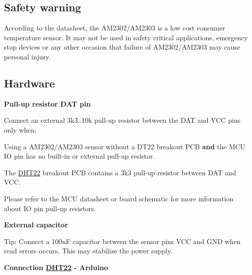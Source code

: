 \subsection*{Safety warning}

According to the datasheet, the A\+M2302/\+A\+M2303 is a low cost consumer temperature sensor. It may not be used in safety critical applications, emergency stop devices or any other occasion that failure of A\+M2302/\+A\+M2303 may cause personal injury.

\subsection*{Hardware}



{\bfseries Pull-\/up resistor D\+AT pin}


\begin{DoxyItemize}
\item Connect an external {\ttfamily 3k3..10k} pull-\/up resistor between the {\ttfamily D\+AT} and {\ttfamily V\+CC} pins only when\+:
\begin{DoxyItemize}
\item Using a A\+M2302/\+A\+M2303 sensor without a D\+T22 breakout P\+CB {\bfseries and} the M\+CU IO pin has no built-\/in or external pull-\/up resistor.
\end{DoxyItemize}
\item The \hyperlink{class_d_h_t22}{D\+H\+T22} breakout P\+CB contains a {\ttfamily 3k3} pull-\/up resistor between {\ttfamily D\+AT} and {\ttfamily V\+CC}.
\item Please refer to the M\+CU datasheet or board schematic for more information about IO pin pull-\/up resistors.
\end{DoxyItemize}

{\bfseries External capacitor}


\begin{DoxyItemize}
\item Tip\+: Connect a {\ttfamily 100nF} capacitor between the sensor pins {\ttfamily V\+CC} and {\ttfamily G\+ND} when read errors occurs. This may stabilize the power supply.
\end{DoxyItemize}

{\bfseries Connection \hyperlink{class_d_h_t22}{D\+H\+T22} -\/ Arduino}

